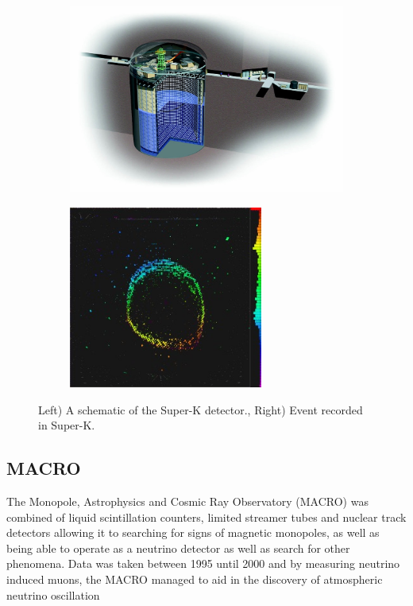 \begin{figure}[h!]
\centering
\begin{subfigure}{.5\textwidth}
  \centering
\includegraphics[width=\textwidth]{figures/SK3D.jpg}
\vspace{2mm}
\end{subfigure}%
\begin{subfigure}{.5\textwidth}
  \centering
\includegraphics[width=0.7\textwidth]{figures/SuperKMuon-300x282.jpg}
\vspace{2mm}
\end{subfigure}
\vspace{2mm}
\caption{Left) A schematic of the Super-K detector., Right) Event recorded in Super-K.}
\label{fig:SK}
\end{figure}

\subsection{MACRO}
The Monopole, Astrophysics and Cosmic Ray Observatory (MACRO) was combined of liquid scintillation counters, limited streamer tubes and nuclear track detectors allowing it to searching for signs of magnetic monopoles, as well as being able to operate as a neutrino detector as well as search for other phenomena. Data was taken between 1995 until 2000 and by measuring neutrino induced muons, the MACRO managed to aid in the discovery of atmospheric neutrino oscillation~\cite{62MACRO}

